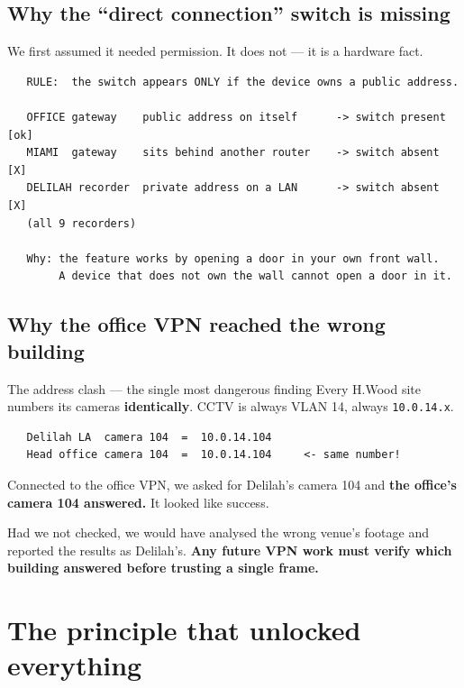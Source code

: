 \documentclass[11pt,a4paper]{article}
\begin{document}
\subsection{Why the ``direct connection'' switch is missing}

We first assumed it needed permission. It does not --- it is a hardware fact.

\begin{verbatim}
   RULE:  the switch appears ONLY if the device owns a public address.

   OFFICE gateway    public address on itself      -> switch present  [ok]
   MIAMI  gateway    sits behind another router    -> switch absent   [X]
   DELILAH recorder  private address on a LAN      -> switch absent   [X]
   (all 9 recorders)

   Why: the feature works by opening a door in your own front wall.
        A device that does not own the wall cannot open a door in it.
\end{verbatim}

\subsection{Why the office VPN reached the wrong building}

\begin{alert}{The address clash --- the single most dangerous finding}
Every H.Wood site numbers its cameras \textbf{identically}. CCTV is always
VLAN 14, always \texttt{10.0.14.x}.

\begin{verbatim}
   Delilah LA  camera 104  =  10.0.14.104
   Head office camera 104  =  10.0.14.104     <- same number!
\end{verbatim}

Connected to the office VPN, we asked for Delilah's camera 104 and
\textbf{the office's camera 104 answered.} It looked like success.

\vspace{4pt}
Had we not checked, we would have analysed the wrong venue's footage and
reported the results as Delilah's. \textbf{Any future VPN work must verify
which building answered before trusting a single frame.}
\end{alert}

\section{The principle that unlocked everything}
\end{document}
